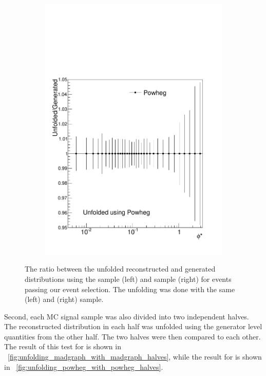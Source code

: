 \begin{figure}[!htbp]
    \begin{subfigure}[b]{\SideBySidePlotWidth}
        \includegraphics[width=\textwidth]{figures/BinM_PP.pdf}
        \caption{}
        \label{fig:unfolding_powheg_with_powheg}
    \end{subfigure}
    \caption{
        The ratio between the unfolded reconstructed and generated \phistar
        distributions using the \MADGRAPH sample (left) and \POWHEG sample
        (right) for events passing our event selection. The unfolding was done
        with the same \MADGRAPH (left) and \POWHEG (right) sample.
    }
    \label{fig:unfolded_vs_true_in_mc}
\end{figure}

Second, each MC signal sample was also divided into two independent halves. The
reconstructed \phistar distribution in each half was unfolded using the
generator level quantities from the other half. The two halves were then
compared to each other. The result of this test for \MADGRAPH is shown in
\FIG~\ref{fig:unfolding_madgraph_with_madgraph_halves}, while the result for
\POWHEG is shown in \FIG~\ref{fig:unfolding_powheg_with_powheg_halves}.

